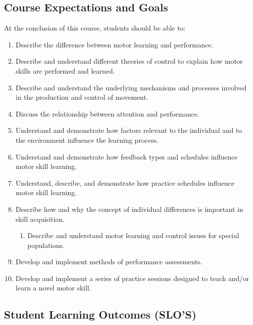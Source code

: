 \documentclass[
  letterpaper,
  DIV=11,
  numbers=noendperiod,
  oneside]{scrartcl}
\providecommand{\tightlist}{%
  \setlength{\itemsep}{0pt}\setlength{\parskip}{0pt}}\usepackage{longtable,booktabs,array}
\begin{document}
\hypertarget{course-expectations-and-goals}{%
\subsection{Course Expectations and
Goals}\label{course-expectations-and-goals}}

At the conclusion of this course, students should be able to:

\begin{enumerate}
\def\labelenumi{\arabic{enumi}.}
\tightlist
\item
  Describe the difference between motor learning and performance.
\item
  Describe and understand different theories of control to explain how
  motor skills are performed and learned.
\item
  Describe and understand the underlying mechanisms and processes
  involved in the production and control of movement.
\item
  Discuss the relationship between attention and performance.
\item
  Understand and demonstrate how factors relevant to the individual and
  to the environment influence the learning process.
\item
  Understand and demonstrate how feedback types and schedules influence
  motor skill learning.
\item
  Understand, describe, and demonstrate how practice schedules influence
  motor skill learning.
\item
  Describe how and why the concept of individual differences is
  important in skill acquisition.

  \begin{enumerate}
  \def\labelenumii{\arabic{enumii}.}
  \tightlist
  \item
    Describe and understand motor learning and control issues for
    special populations.
  \end{enumerate}
\item
  Develop and implement methods of performance assessments.
\item
  Develop and implement a series of practice sessions designed to teach
  and/or learn a novel motor skill.
\end{enumerate}

\hypertarget{student-learning-outcomes-slos}{%
\subsection{Student Learning Outcomes
(SLO'S)}\label{student-learning-outcomes-slos}}
\end{document}
